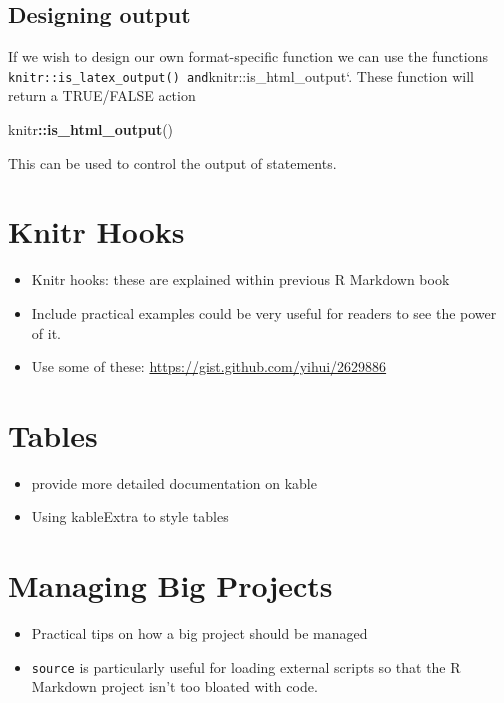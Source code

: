 \documentclass[]{book}
\newenvironment{Shaded}{\begin{snugshade}}{\end{snugshade}}
\newcommand{\KeywordTok}[1]{\textcolor[rgb]{0.13,0.29,0.53}{\textbf{#1}}}
\newcommand{\OperatorTok}[1]{\textcolor[rgb]{0.81,0.36,0.00}{\textbf{#1}}}
\newcommand{\NormalTok}[1]{#1}
\providecommand{\tightlist}{%
  \setlength{\itemsep}{0pt}\setlength{\parskip}{0pt}}
\begin{document}
\section{Designing output}\label{designing-output}

If we wish to design our own format-specific function we can use the
functions
\texttt{knitr::is\_latex\_output()\ and}knitr::is\_html\_output`. These
function will return a TRUE/FALSE action

\begin{Shaded}
\begin{Highlighting}[]
\NormalTok{knitr}\OperatorTok{::}\KeywordTok{is_html_output}\NormalTok{()}
\end{Highlighting}
\end{Shaded}

This can be used to control the output of statements.

\chapter{Knitr Hooks}\label{knitr-hooks}

\begin{itemize}
\tightlist
\item
  Knitr hooks: these are explained within previous R Markdown book
\item
  Include practical examples could be very useful for readers to see the
  power of it.
\item
  Use some of these: \url{https://gist.github.com/yihui/2629886}
\end{itemize}

\chapter{Tables}\label{tables}

\begin{itemize}
\tightlist
\item
  provide more detailed documentation on kable
\item
  Using kableExtra to style tables
\end{itemize}

\chapter{Managing Big Projects}\label{managing-big-projects}

\begin{itemize}
\tightlist
\item
  Practical tips on how a big project should be managed
\item
  \texttt{source} is particularly useful for loading external scripts so
  that the R Markdown project isn't too bloated with code.
\end{itemize}
\end{document}
